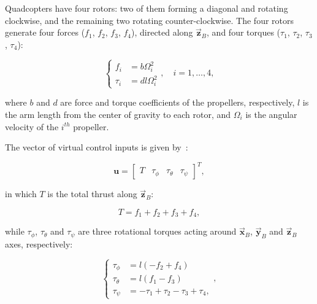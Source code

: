 Quadcopters have four rotors: two of them forming a diagonal and rotating
clockwise, and the remaining two rotating counter-clockwise. The four rotors
generate four forces ($f_1$, $f_2$, $f_3$, $f_4$), directed along
$\vec{\mathbf{z}}_B$, and four torques ($\tau_1$, $\tau_2$, $\tau_3$,
$\tau_4$):

\begin{equation}
  \begin{cases}
    f_i &= b \Omega_i^2 \\
    \tau_i &= dl \Omega_i^2
  \end{cases}
    , \quad i = 1,\ldots, 4,
  \label{eq:motors}
\end{equation}

where $b$ and $d$ are force and torque coefficients of the propellers,
respectively, $l$ is the arm length from the center of gravity to each rotor,
and $\Omega_i$ is the angular velocity of the $i^{th}$ propeller.

The vector of virtual control inputs is given by~\cite{Mahony2012RAM}:

\begin{equation}
  \mathbf{u} = \begin{bmatrix}T & \tau_{\phi} & \tau_{\theta} & \tau_{\psi} \end{bmatrix}^T,
  \label{eq:inputs}
\end{equation}

in which $T$ is the total thrust along $\vec{\mathbf{z}}_B$:

\begin{equation}
  T = f_1 + f_2 + f_3 + f_4,
  \label{eq:T}
\end{equation}

while $\tau_{\phi}$, $\tau_{\theta}$ and $\tau_{\psi}$ are three rotational torques acting
around $\vec{\mathbf{x}}_B$, $\vec{\mathbf{y}}_B$ and $\vec{\mathbf{z}}_B$
axes, respectively:

\begin{equation}
  \begin{cases}
    \tau_{\phi} &= l (-f_2 + f_4) \\
    \tau_{\theta} &= l (f_1 - f_3) \\
    \tau_{\psi} &= -\tau_1 + \tau_2 - \tau_3 + \tau_4,
  \end{cases},
  \label{eq:tau}
\end{equation}

